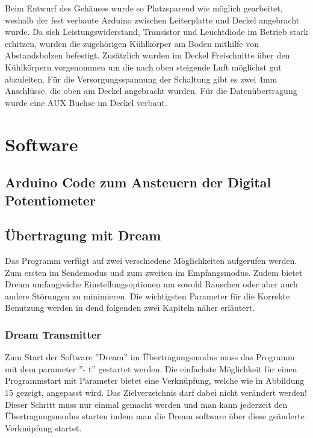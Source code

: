 Beim Entwurf des Gehäuses wurde so Platzsparend wie möglich gearbeitet, weshalb
der fest verbaute Arduino zwischen Leiterplatte und Deckel angebracht wurde.
Da sich Leistungswiderstand, Transistor und Leuchtdiode im Betrieb stark erhitzen,
wurden die zugehörigen Kühlkörper am Boden mithilfe von Abstandsbolzen
befestigt. Zusätzlich wurden im Deckel Freischnitte über den Kühlkörpern vorgenommen
um die nach oben steigende Luft möglichst gut abzuleiten. Für die
Versorgungsspannung der Schaltung gibt es zwei 4mm Anschlüsse, die oben am
Deckel angebracht wurden. Für die Datenübertragung wurde eine AUX Buchse im
Deckel verbaut.

\section{Software}
\label{sec:Software}
\subsection{Arduino Code zum Ansteuern der Digital Potentiometer}
\label{subsec:Unterabschnitt12}


\subsection{Übertragung mit Dream}
\label{subsec:dream}

Das Programm verfügt auf zwei verschiedene Möglichkeiten aufgerufen werden. Zum ersten im Sendemodus und zum zweiten im Empfangsmodus. Zudem bietet Dream umfangreiche Einstellungsoptionen um sowohl Rauschen oder aber auch andere Störungen zu minimieren. Die wichtigsten Parameter für die Korrekte Benutzung werden in dend
folgenden zwei Kapiteln näher erläutert.



\subsubsection{Dream Transmitter}
\label{subsubsec:dreamtx}
Zum Start der Software ”Dream” im Übertragungsmodus muss das Programm mit dem parameter ”- t” gestartet werden. Die einfachste Möglichkeit für einen Programmstart mit Parameter bietet eine Verknüpfung, welche wie in Abbildung 15 gezeigt, angepasst wird. Das Zielverzeichnis darf dabei nicht verändert werden! Dieser Schritt muss nur einmal gemacht werden und man kann jederzeit den Übertragungsmodus starten indem man die Dream software über diese geänderte Verknüpfung startet.

